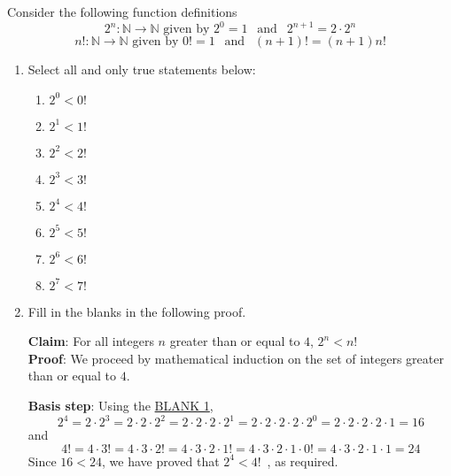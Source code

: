 \documentclass[12pt, oneside]{article}
\begin{document}
\begin{enumerate}
\begin{enumerate}
Consider the following function definitions
\[
    2^n: \mathbb{N} \to \mathbb{N} \text{ given by } 2^0 = 1 ~~\text{ and }~~
    2^{n+1} = 2 \cdot 2^n  
\]
\[
    n!: \mathbb{N} \to \mathbb{N} \text{ given by } 0! = 1 ~~\text{ and }~~
    (n+1)! = (n+1) n!
\]
\begin{enumerate}
\item Select all and only true statements below: 
    \begin{enumerate}
        \item $2^0 < 0!$
        \item $2^1 < 1!$
        \item $2^2 < 2!$
        \item $2^3 < 3!$
        \item $2^4 < 4!$
        \item $2^5 < 5!$
        \item $2^6 < 6!$
        \item $2^7 < 7!$
    \end{enumerate}

\item Fill in the blanks in the following proof.

{\bf Claim}: For all integers $n$ greater than or equal to $4$, $2^n < n!$ \\

{\bf Proof}: We proceed by mathematical induction on the set of integers greater than or equal to $4$.

{\bf Basis step}: Using the \underline{\hspace{0.2in}BLANK 1\hspace{0.2in}}, 
\[
    2^4 = 2 \cdot 2^3 = 2 \cdot 2 \cdot 2^2 = 2 \cdot 2 \cdot 2 \cdot 2^1 =
    2 \cdot 2 \cdot 2 \cdot 2 \cdot 2^0 =
    2 \cdot 2 \cdot 2 \cdot 2 \cdot 1 = 16 
\]
and
\[
    4! = 4 \cdot 3! = 4 \cdot 3 \cdot 2! 
    = 4 \cdot 3 \cdot 2 \cdot 1! = 4 \cdot 3 \cdot 2 \cdot 1 \cdot 0!
    = 4 \cdot 3 \cdot 2 \cdot 1 \cdot 1 = 24
\]
Since $16 < 24$, we have proved that $2^4 < 4!$~, as required.\\


\end{enumerate}
\end{enumerate}
\end{enumerate}
\end{document}
